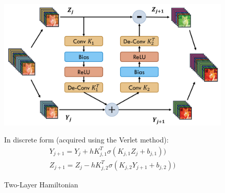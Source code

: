 \documentclass{article}
\theoremstyle{remark}
\begin{document}
\begin{figure}[H]
    \centering
    \begin{minipage}{0.45\textwidth}
        \centering
        \includegraphics[width=\textwidth]{imgs/two_layer_hamiltonian_block.png} %
        \caption{Two-Layer Hamiltonian}
    \end{minipage}\hfill
    \begin{minipage}{0.45\textwidth}
        \centering
        In discrete form (acquired using the Verlet method):
        \begin{gather*}
            Y_{j+1} = Y_{j} + h K^T_{j,1} \sigma (K_{j,1} Z_j + b_{j,1})) \\
            Z_{j+1} = Z_{j} - h K^T_{j,2} \sigma (K_{j,2} Y_{j+1} + b_{j,2}))
        \end{gather*}
    \end{minipage}
\end{figure}
\end{document}
